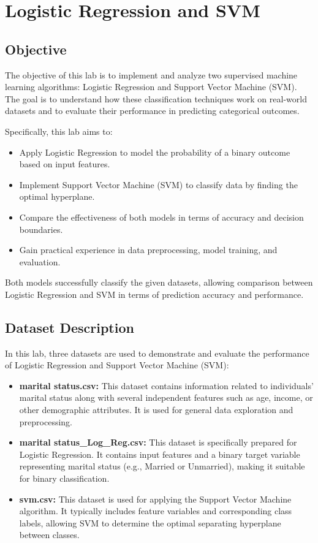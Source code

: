 \documentclass[11pt,a4paper]{report}
\begin{document}
\chapter{Logistic Regression and SVM}

\section*{Objective}
The objective of this lab is to implement and analyze two supervised machine learning algorithms: Logistic Regression and Support Vector Machine (SVM). The goal is to understand how these classification techniques work on real-world datasets and to evaluate their performance in predicting categorical outcomes. 

Specifically, this lab aims to:
\begin{itemize}
    \item Apply Logistic Regression to model the probability of a binary outcome based on input features.
    \item Implement Support Vector Machine (SVM) to classify data by finding the optimal hyperplane.
    \item Compare the effectiveness of both models in terms of accuracy and decision boundaries.
    \item Gain practical experience in data preprocessing, model training, and evaluation.
\end{itemize}


Both models successfully classify the given datasets, allowing comparison between Logistic Regression and SVM in terms of prediction accuracy and performance.


\section*{Dataset Description}

In this lab, three datasets are used to demonstrate and evaluate the performance of Logistic Regression and Support Vector Machine (SVM):

\begin{itemize}
    \item \textbf{marital status.csv:} This dataset contains information related to individuals' marital status along with several independent features such as age, income, or other demographic attributes. It is used for general data exploration and preprocessing.

    \item \textbf{marital status\_Log\_Reg.csv:} This dataset is specifically prepared for Logistic Regression. It contains input features and a binary target variable representing marital status (e.g., Married or Unmarried), making it suitable for binary classification.

    \item \textbf{svm.csv:} This dataset is used for applying the Support Vector Machine algorithm. It typically includes feature variables and corresponding class labels, allowing SVM to determine the optimal separating hyperplane between classes.
\end{itemize}
\end{document}
